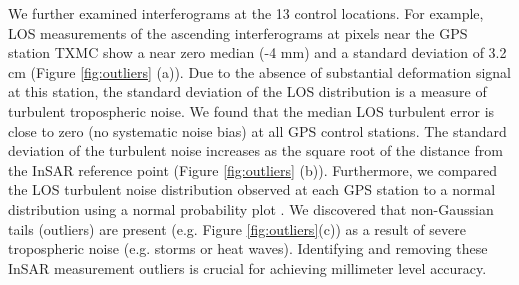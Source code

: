 We further examined interferograms at the 13 control locations. For example, LOS measurements of the ascending interferograms at pixels near the GPS station TXMC show a near zero median (-4 mm) and a standard deviation of 3.2 cm (Figure \ref{fig:outliers} (a)). Due to the absence of substantial deformation signal at this station, the standard deviation of the LOS distribution is a measure of turbulent tropospheric noise.  We found that the median LOS turbulent error is close to zero (no systematic noise bias) at all GPS control stations. The standard deviation of the turbulent noise increases as the square root of the distance from the InSAR reference point (Figure \ref{fig:outliers} (b)). Furthermore, we compared the LOS turbulent noise distribution observed at each GPS station to a normal distribution using a normal probability plot \citep{Filliben1975ProbabilityPlotCorrelation}. We discovered that non-Gaussian tails (outliers) are present (e.g. Figure \ref{fig:outliers}(c)) as a result of severe tropospheric noise (e.g. storms or heat waves). Identifying and removing these InSAR measurement outliers is crucial for achieving millimeter level accuracy. 




